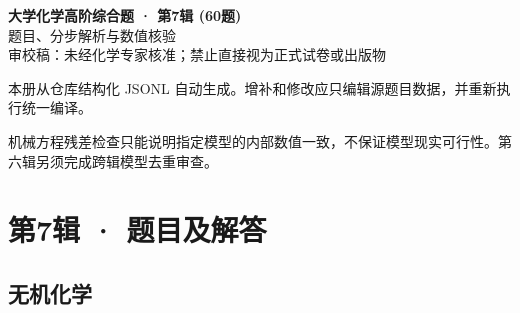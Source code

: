 \documentclass[UTF8,11pt,a4paper]{ctexart}
\begin{document}
\begin{center}
{\LARGE\bfseries 大学化学高阶综合题 · 第7辑 (60题)}\\[0.8em]
{\large 题目、分步解析与数值核验}\\[0.5em]
{\small \textcolor{red!65!black}{审校稿：未经化学专家核准；禁止直接视为正式试卷或出版物}}
\end{center}
\vspace{1em}
\noindent 本册从仓库结构化 JSONL 自动生成。增补和修改应只编辑源题目数据，并重新执行统一编译。
\par 机械方程残差检查只能说明指定模型的内部数值一致，不保证模型现实可行性。第六辑另须完成跨辑模型去重审查。
\tableofcontents
\clearpage
\section*{第7辑 · 题目及解答}
\subsection*{无机化学}
\end{document}
